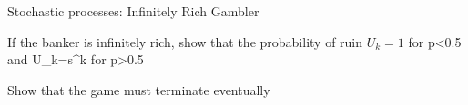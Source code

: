 Stochastic processes: Infinitely Rich Gambler

If the banker is infinitely rich, show that the probability of ruin $U_k= 1$ for p<0.5 and U_k=s^k for p>0.5

Show that the game must terminate eventually

